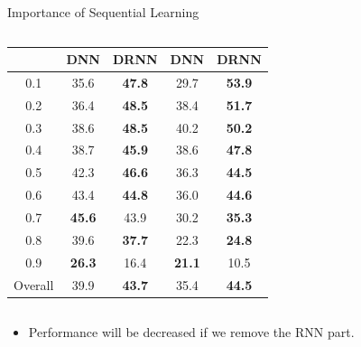 \documentclass[10pt,table,mathserif]{beamer}
\begin{document}
\begin{frame}[fragile]{Importance of Sequential Learning}
\begin{columns}
\begin{column}{0.60\linewidth}
\begin{table}[htp!]
{\begin{tabular}{|c|cc| cc|}
			& \multicolumn{1}{c}{\small DNN }  &\multicolumn{1}{c}{\small DRNN} & \multicolumn{1}{c}{\small DNN} & \multicolumn{1}{c|}{\small DRNN } \\ \hline
			0.1       &35.6   &\textbf{47.8}     &29.7         & \textbf{53.9}  \\
			0.2       &36.4   &\textbf{48.5}     &38.4         & \textbf{51.7}  \\
			0.3       &38.6   &\textbf{48.5}     &40.2         & \textbf{50.2}  \\
			0.4       &38.7   &\textbf{45.9}     &38.6         & \textbf{47.8}  \\
			0.5       &42.3   &\textbf{46.6}     &36.3         & \textbf{44.5}  \\
			0.6       &43.4   &\textbf{44.8}     &36.0         & \textbf{44.6}  \\
			0.7       &\textbf{45.6} &43.9       &30.2         & \textbf{35.3}  \\
			0.8       &39.6   &\textbf{37.7}     &22.3         & \textbf{24.8}  \\
			0.9       &\textbf{26.3} &16.4       &\textbf{21.1}         & 10.5  \\
			Overall   &39.9   &\textbf{43.7}     &35.4         & \textbf{44.5}  \\
			\hline
		\end{tabular}
}
\end{table}
\end{column}
\end{columns}
\begin{itemize}
  \item Performance will be decreased if we remove the RNN part.
\end{itemize}
\end{frame}
\end{document}

